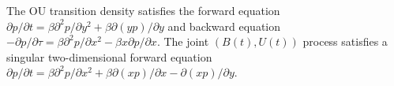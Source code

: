 The OU transition density satisfies the forward equation $\partial p/\partial t = \beta \partial^2 p/\partial y^2 + \beta \partial(y p)/\partial y$ and backward equation $-\partial p/\partial \tau = \beta \partial^2 p/\partial x^2 - \beta x \partial p/\partial x$. The joint $(B(t), U(t))$ process satisfies a singular two-dimensional forward equation $\partial p/\partial t = \beta \partial^2 p/\partial x^2 + \beta \partial(x p)/\partial x - \partial(x p)/\partial y$.
